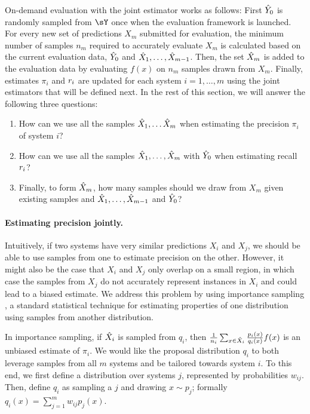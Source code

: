 On-demand evaluation with the joint estimator works as follows:
First ${\hat{Y}}_0$ is randomly sampled from $\sY$ once when the evaluation framework is launched.
For every new set of predictions $X_m$ submitted for evaluation, the minimum number of samples $n_m$ required to accurately evaluate $X_m$ is calculated based on the current evaluation data, ${\hat{Y}}_0$ and ${\hat{X}}_1, \ldots, {\hat{X}}_{m-1}$.
Then, the set ${\hat{X}}_m$ is added to the evaluation data by evaluating $f(x)$ on $n_m$ samples drawn from $X_m$.
Finally, estimates $\pi_i$ and $r_i$ are updated for each system $i = 1,\ldots,m$ using the joint estimators that will be defined next.
In the rest of this section, we will answer the following three questions:
\begin{enumerate}
    \itemsep0pt
  \item How can we use all the samples ${\hat{X}}_1, \ldots {\hat{X}}_m$ when estimating the precision $\pi_i$ of system $i$?
  \item How can we use all the samples ${\hat{X}}_1, \ldots, {\hat{X}}_m$ with ${\hat{Y}}_0$ when estimating recall $r_i$?
  \item Finally, to form ${\hat{X}}_m$, how many samples should we draw from $X_m$ given existing samples and ${\hat{X}}_1, \ldots, {\hat{X}}_{m-1}$ and ${\hat{Y}}_0$?
\end{enumerate}

\paragraph{Estimating precision jointly.}
Intuitively, if two systems have very similar predictions $X_i$ and $X_j$, we should be able to use samples from one to estimate precision on the other.
However, it might also be the case that $X_i$ and $X_j$ only overlap on a small region, in which case the samples from $X_j$ do not accurately represent instances in $X_i$ and could lead to a biased estimate.
We address this problem by using importance sampling \citep{owen2013monte}, a standard statistical technique for estimating properties of one distribution using samples from another distribution.

In importance sampling, if ${\hat{X}}_i$ is sampled from $q_i$, then $\frac{1}{n_i} \sum_{x \in {\hat{X}}_i} \frac{p_i(x)}{q_i(x)} f(x)$ is an unbiased estimate of $\pi_i$.
We would like the proposal distribution $q_i$ to both leverage samples from all $m$ systems and be tailored towards system $i$.
To this end, we first define a distribution over systems $j$, represented by probabilities $w_{ij}$.
Then, define $q_i$ as sampling a $j$ and drawing $x \sim p_j$;
formally $q_i(x) = \sum_{j=1}^m w_{ij} p_j(x)$.

